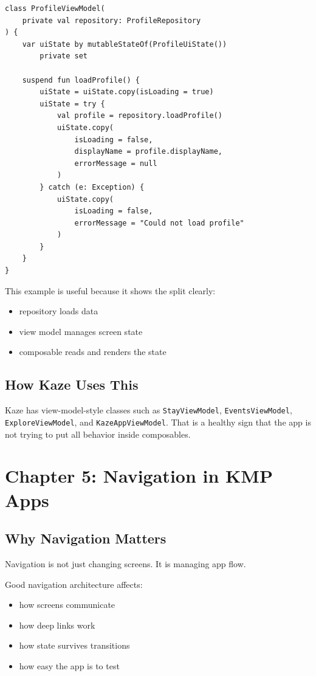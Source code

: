 \documentclass[11pt,a4paper]{article}
\begin{document}
\begin{lstlisting}[style=kazekotlin]
class ProfileViewModel(
    private val repository: ProfileRepository
) {
    var uiState by mutableStateOf(ProfileUiState())
        private set

    suspend fun loadProfile() {
        uiState = uiState.copy(isLoading = true)
        uiState = try {
            val profile = repository.loadProfile()
            uiState.copy(
                isLoading = false,
                displayName = profile.displayName,
                errorMessage = null
            )
        } catch (e: Exception) {
            uiState.copy(
                isLoading = false,
                errorMessage = "Could not load profile"
            )
        }
    }
}
\end{lstlisting}

This example is useful because it shows the split clearly:
\begin{itemize}
    \item repository loads data
    \item view model manages screen state
    \item composable reads and renders the state
\end{itemize}

\subsection{How Kaze Uses This}

Kaze has view-model-style classes such as \texttt{StayViewModel}, \texttt{EventsViewModel}, \texttt{ExploreViewModel}, and \texttt{KazeAppViewModel}. That is a healthy sign that the app is not trying to put all behavior inside composables.

\section{Chapter 5: Navigation in KMP Apps}

\subsection{Why Navigation Matters}

Navigation is not just changing screens. It is managing app flow.

Good navigation architecture affects:
\begin{itemize}
    \item how screens communicate
    \item how deep links work
    \item how state survives transitions
    \item how easy the app is to test
\end{itemize}
\end{document}
